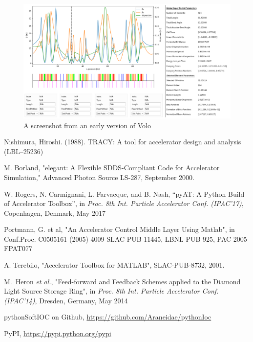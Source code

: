 \documentclass[a4paper,
               keeplastbox,   %
               ]{jacow}
\begin{document}
\begin{figure}[!hbt]
    \centering
    \includegraphics*[width=\columnwidth]{volo}

    \caption{A screenshot from an early version of Volo}
    \label{fig:volo}
\end{figure}

\begin{thebibliography}{9}                                                      
                  
    Nishimura, Hiroshi. (1988). TRACY: A tool for accelerator design and analysis (LBL--25236)

    M. Borland, "elegant: A Flexible SDDS-Compliant Code for Accelerator Simulation," Advanced Photon Source LS-287, September 2000.
      
    W. Rogers, N. Carmignani, L. Farvacque, and B. Nash,
    \textquotedblleft{pyAT: A Python Build of Accelerator Toolbox}\textquotedblright,
    in \emph{Proc. 8th Int. Particle Accelerator Conf. (IPAC'17)}, 
    Copenhagen, Denmark, May 2017

     Portmann, G. et al, "An Accelerator Control Middle Layer Using Matlab", 
     in Conf.Proc. C0505161 (2005) 4009 SLAC-PUB-11445, LBNL-PUB-925, PAC-2005-FPAT077 
     
    A. Terebilo, "Accelerator Toolbox for MATLAB", SLAC-PUB-8732, 2001.   
    
  M.~Heron {\it et al.},
  "Feed-forward and Feedback Schemes applied to the Diamond Light Source Storage Ring",
      in \emph{Proc. 8th Int. Particle Accelerator Conf. (IPAC'14)}, 
    Dresden, Germany, May 2014

    pythonSoftIOC on Github, \url{https://github.com/Araneidae/pythonIoc} 
    
    PyPI, \url{https://pypi.python.org/pypi} 
                                                  
\end{thebibliography}                                                 
\end{document}
